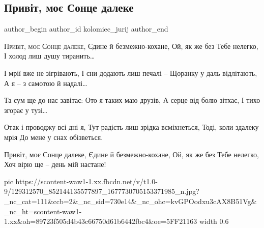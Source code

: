 
 
 
 
 
 
\subsection{Привіт, моє Сонце далеке}
\label{sec:02_12_2020.fb.kolomiec_jurij.1.pryvit_moje_sonce_daleke}
\ifcmt
  author_begin
   author_id kolomiec_jurij
  author_end
\fi

\begin{multicols}{2}
\obeycr
\lettrine[lines=3]{П}{ривіт, моє Сонце далеке},
Єдине й безмежно-кохане,
Ой, як же без Тебе нелегко,
І холод лиш душу тиранить…

І мрії вже не зігрівають,
І сни додають лиш печалі –
Щоранку у даль відлітають,
А я – з самотою й надалі…

Та сум ще до нас завітає:
Ото я таких маю друзів,
А серце від болю зітхає,
І тихо згорає у тузі…

Отак і проводжу всі дні я,
Тут радість лиш зрідка всміхнеться,
Тоді, коли здалеку мрія
До мене у снах обізветься.

Привіт, моє Сонце далеке,
Єдине й безмежно-кохане,
Ой, як же без Тебе нелегко,
Хоч вірю ще – день мій настане!
\restorecr
\end{multicols}

\ifcmt
pic https://scontent-waw1-1.xx.fbcdn.net/v/t1.0-9/129312570_852144135577897_1677730705153371985_n.jpg?_nc_cat=111&ccb=2&_nc_sid=730e14&_nc_ohc=kvGPOodxu3cAX8B51Vg&_nc_ht=scontent-waw1-1.xx&oh=89723f505d4b43c66750d61b6442fbc4&oe=5FF21163
width 0.6
\fi
